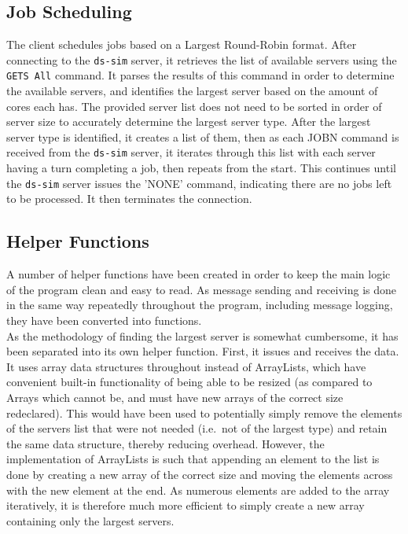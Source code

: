 \documentclass[a4paper]{article} %
\begin{document}
\subsection{Job Scheduling}
The client schedules jobs based on a Largest Round-Robin format. After connecting to the \texttt{ds-sim} server, it retrieves the list of available servers using the \texttt{GETS All} command. It parses the results of this 
command in order to determine the available servers, and identifies the largest server based on the amount of cores each has. The provided server list does not need to be sorted in order of server size to accurately 
determine the largest server type. After the largest server type is identified, it creates a list of them, then as each JOBN command is received from the \texttt{ds-sim} server, it iterates through this list with each 
server having a turn completing a job, then repeats from the start. This continues until the \texttt{ds-sim} server issues the 'NONE' command, indicating there are no jobs left to be processed. 
It then terminates the connection.

\subsection{Helper Functions}
A number of helper functions have been created in order to keep the main logic of the program clean and easy to read. As message sending and receiving is done in the same way repeatedly throughout the program, including 
message logging, they have been converted into functions.\\
As the methodology of finding the largest server is somewhat cumbersome, it has been separated into its own helper function. First, it issues and receives the data. It uses array data structures throughout instead of 
ArrayLists, which have convenient built-in functionality of being able to be resized (as compared to Arrays which cannot be, and must have new arrays of the correct size redeclared). This would have been used to potentially 
simply remove the elements of the servers list that were not needed (i.e.\ not of the largest type) and retain the same data structure, thereby reducing overhead. However, the implementation of ArrayLists is such that 
appending an element to the list is done by creating a new array of the correct size and moving the elements across with the new element at the end. As numerous elements are added to the array iteratively, it is therefore 
much more efficient to simply create a new array containing only the largest servers.





\end{document}

